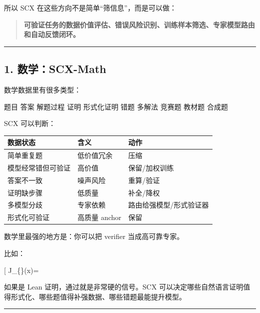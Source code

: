 \documentclass[
  12pt,
]{ctexart}
\newenvironment{Shaded}{}{}
\newcommand{\NormalTok}[1]{#1}
\begin{document}
所以 SCX 在这些方向不是简单``筛信息''，而是可以做：

\begin{quote}
\textbf{可验证任务的数据价值评估、错误风险识别、训练样本筛选、专家模型路由和自动反馈闭环。}
\end{quote}

\begin{center}\rule{0.5\linewidth}{0.5pt}\end{center}

\subsection{1. 数学：SCX-Math}\label{ux6570ux5b66scx-math}

数学数据里有很多类型：

\begin{Shaded}
\begin{Highlighting}[]
\NormalTok{题目}
\NormalTok{答案}
\NormalTok{解题过程}
\NormalTok{证明}
\NormalTok{形式化证明}
\NormalTok{错题}
\NormalTok{多解法}
\NormalTok{竞赛题}
\NormalTok{教材题}
\NormalTok{合成题}
\end{Highlighting}
\end{Shaded}

SCX 可以判断：

\begin{longtable}[]{@{}lll@{}}
\toprule\noalign{}
数据状态 & 含义 & 动作 \\
\midrule\noalign{}
\endhead
\bottomrule\noalign{}
\endlastfoot
简单重复题 & 低价值冗余 & 压缩 \\
模型经常错但可验证 & 高价值 & 保留/加权训练 \\
答案不一致 & 噪声风险 & 重算/验证 \\
证明缺步骤 & 低质量 & 补全/降权 \\
多模型分歧 & 专家依赖 & 路由给强模型/形式验证器 \\
形式化可验证 & 高质量 anchor & 保留 \\
\end{longtable}

数学里最强的地方是：你可以把 verifier 当成高可靠专家。

比如：

{[} J\_\{\}(x)=\mathbf 1{[}\text{proof passes}{]}{]}

如果是 Lean 证明，通过就是非常硬的信号。SCX
可以决定哪些自然语言证明值得形式化、哪些题值得补强数据、哪些错题最能提升模型。

\begin{center}\rule{0.5\linewidth}{0.5pt}\end{center}
\end{document}

